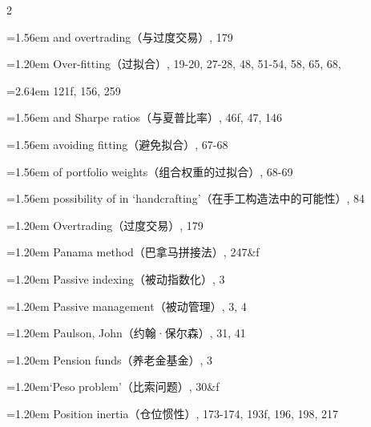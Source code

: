 {\begin{multicols}{2}
\par \noindent\hangindent=1.56em\hspace*{0.36em} and overtrading（与过度交易）, 179
\par \noindent\hangindent=1.20em\hspace*{0.00em} Over-fitting（过拟合）, 19-20, 27-28, 48, 51-54, 58, 65, 68,
\par \noindent\hangindent=2.64em\hspace*{1.44em} 121f, 156, 259
\par \noindent\hangindent=1.56em\hspace*{0.36em} and Sharpe ratios（与夏普比率）, 46f, 47, 146
\par \noindent\hangindent=1.56em\hspace*{0.36em} avoiding fitting（避免拟合）, 67-68
\par \noindent\hangindent=1.56em\hspace*{0.36em} of portfolio weights（组合权重的过拟合）, 68-69
\par \noindent\hangindent=1.56em\hspace*{0.36em} possibility of in ‘handcrafting’（在手工构造法中的可能性）, 84
\par \noindent\hangindent=1.20em\hspace*{0.00em} Overtrading（过度交易）, 179
\par \noindent\hangindent=1.20em\hspace*{0.00em} Panama method（巴拿马拼接法）, 247\&f
\par \noindent\hangindent=1.20em\hspace*{0.00em} Passive indexing（被动指数化）, 3
\par \noindent\hangindent=1.20em\hspace*{0.00em} Passive management（被动管理）, 3, 4
\par \noindent\hangindent=1.20em\hspace*{0.00em} Paulson, John（约翰·保尔森）, 31, 41
\par \noindent\hangindent=1.20em\hspace*{0.00em} Pension funds（养老金基金）, 3
\par \noindent\hangindent=1.20em\hspace*{0.00em}‘Peso problem’（比索问题）, 30\&f
\par \noindent\hangindent=1.20em\hspace*{0.00em} Position inertia（仓位惯性）, 173-174, 193f, 196, 198, 217

\end{multicols}}
